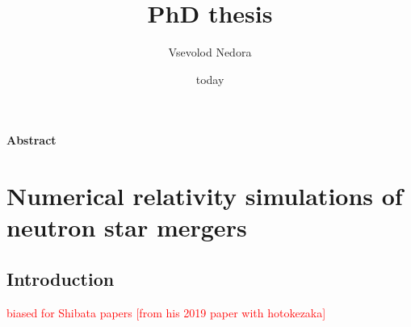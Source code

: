 \documentclass[11pt,a4paper,headinclude=true,DIV=14,BCOR=8mm,chapterprefix,listof=totoc,twoside,openright,abstracton]{scrbook}
\title{PhD thesis}
\author{Vsevolod Nedora}
\date{today}
\newcommand{\red}[1]{\textcolor{red}{#1}}
\begin{document}
\maketitle

\mainmatter



\begin{center}
    \textbf{Abstract} \\[1cm]
\end{center}


\part{Numerical relativity simulations of neutron star mergers}

\chapter{Introduction}

\red{biased for Shibata papers [from his 2019 paper with hotokezaka]}
\end{document}
